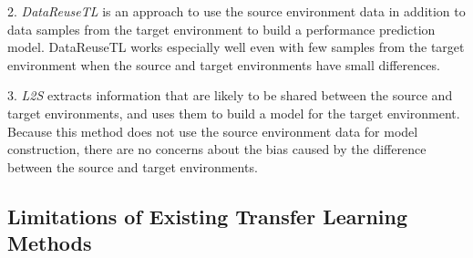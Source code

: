 2. \textit{DataReuseTL} is an approach to use the source environment data in addition to data samples from the target environment to build a performance prediction model\cite{datareuse}. 
DataReuseTL works especially well even with few samples from the target environment when the source and target environments have small differences.

3. \textit{L2S} extracts information that are likely to be shared between the source and target environments\cite{jamshidi}, and uses them to build a model for the target environment\cite{l2s}.
Because this method does not use the source environment data for model construction, there are no concerns about the bias caused by the difference between the source and target environments.

\subsection{Limitations of Existing Transfer Learning Methods}
\label{sec:prelim:limitation}

